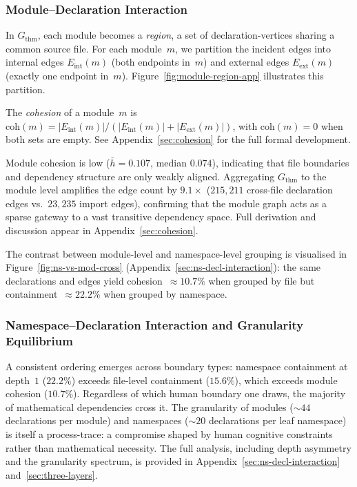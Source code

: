 \subsubsection{Module--Declaration Interaction}
\label{sec:cohesion-main}

In $G_{\mathrm{thm}}$, each module becomes a \emph{region}, a set of declaration-vertices sharing a common source file. For each module~$m$, we partition the incident edges into internal edges $E_{\mathrm{int}}(m)$ (both endpoints in~$m$) and external edges $E_{\mathrm{ext}}(m)$ (exactly one endpoint in~$m$). Figure~\ref{fig:module-region-app} illustrates this partition.

\begin{definition}
\label{def:cohesion}
The \emph{cohesion} of a module~$m$ is
$\mathrm{coh}(m) = |E_{\mathrm{int}}(m)| / (|E_{\mathrm{int}}(m)| + |E_{\mathrm{ext}}(m)|)$,
with $\mathrm{coh}(m) = 0$ when both sets are empty. See Appendix~\ref{sec:cohesion} for the full formal development.
\end{definition}

Module cohesion is low ($\bar{h} = 0.107$, median $0.074$), indicating that file boundaries and dependency structure are only weakly aligned. Aggregating $G_{\mathrm{thm}}$ to the module level amplifies the edge count by $9.1\times$ ($215{,}211$ cross-file declaration edges vs.\ $23{,}235$ import edges), confirming that the module graph acts as a sparse gateway to a vast transitive dependency space. Full derivation and discussion appear in Appendix~\ref{sec:cohesion}.

The contrast between module-level and namespace-level grouping is visualised in Figure~\ref{fig:ns-vs-mod-cross} (Appendix~\ref{sec:ns-decl-interaction}): the same declarations and edges yield cohesion~$\approx 10.7\%$ when grouped by file but containment~$\approx 22.2\%$ when grouped by namespace.

\subsubsection{Namespace--Declaration Interaction and Granularity Equilibrium}
\label{sec:ns-decl-main}
\label{sec:granularity-main}

A consistent ordering emerges across boundary types: namespace containment at depth~$1$ ($22.2\%$) exceeds file-level containment ($15.6\%$), which exceeds module cohesion ($10.7\%$). Regardless of which human boundary one draws, the majority of mathematical dependencies cross it. The granularity of modules (${\sim}44$ declarations per module) and namespaces (${\sim}20$ declarations per leaf namespace) is itself a process-trace: a compromise shaped by human cognitive constraints rather than mathematical necessity. The full analysis, including depth asymmetry and the granularity spectrum, is provided in Appendix~\ref{sec:ns-decl-interaction} and~\ref{sec:three-layers}.

